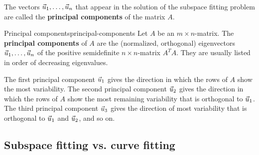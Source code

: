 \documentclass{ximera}
\begin{document}
The vectors $\vec{u}_1,\ldots,\vec{u}_n$ that appear in the solution
of the subspace fitting problem are called the \textbf{principal
  components} of the matrix $A$.

\begin{definition}{Principal components}{principal-components}
  Let $A$ be an $m\times n$-matrix. The \textbf{principal components}%
   of $A$ are the (normalized,
  orthogonal) eigenvectors $\vec{u}_1,\ldots,\vec{u}_n$ of the
  positive semidefinite $n\times n$-matrix $A^TA$. They are usually
  listed in order of decreasing eigenvalues.
\end{definition}

The first principal component $\vec{u}_1$ gives the direction in
which the rows of $A$ show the most variability. The second principal
component $\vec{u}_2$ gives the direction in which the rows of $A$
show the most remaining variability that is orthogonal to
$\vec{u}_1$. The third principal component $\vec{u}_3$ gives the
direction of most variability that is orthogonal to $\vec{u}_1$ and
$\vec{u}_2$, and so on.

\subsection*{Subspace fitting vs. curve fitting}
\end{document}
